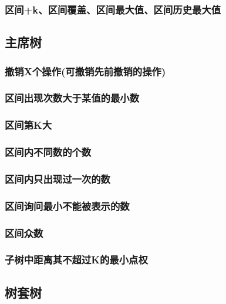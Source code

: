 \documentclass[10pt,a4paper]{article}
\begin{document}
	\subsubsection{区间+k、区间覆盖、区间最大值、区间历史最大值}
	
	\subsection{主席树}
	\subsubsection{撤销X个操作(可撤销先前撤销的操作)}
	
	\subsubsection{区间出现次数大于某值的最小数}
	
	\subsubsection{区间第K大}
	
	\subsubsection{区间内不同数的个数}
	
	\subsubsection{区间内只出现过一次的数}
	
	\subsubsection{区间询问最小不能被表示的数}
	
	\subsubsection{区间众数}
	
	\subsubsection{子树中距离其不超过K的最小点权}
	
	\subsection{树套树}
\end{document}
